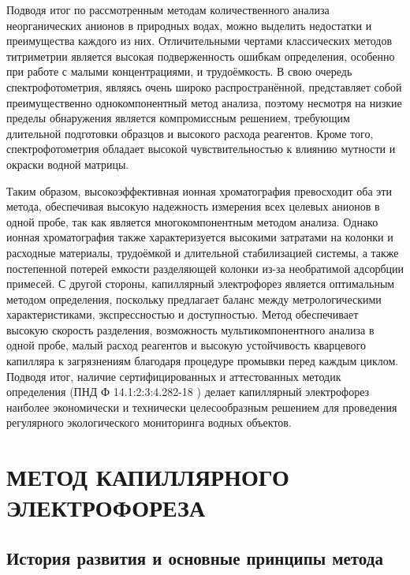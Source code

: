 Подводя итог по рассмотренным методам количественного анализа неорганических анионов в природных водах, можно выделить недостатки и преимущества каждого из них. Отличительными чертами классических методов титриметрии является высокая подверженность ошибкам определения, особенно при работе с малыми концентрациями, и трудоёмкость. В свою очередь спектрофотометрия, являясь очень широко распространённой, представляет собой преимущественно однокомпонентный метод анализа, поэтому несмотря на низкие пределы обнаружения является компромиссным решением, требующим длительной подготовки образцов и высокого расхода реагентов. Кроме того, спектрофотометрия обладает высокой чувствительностью к влиянию мутности и окраски водной матрицы.

Таким образом, высокоэффективная ионная хроматография превосходит оба эти метода, обеспечивая высокую надежность измерения всех целевых анионов в одной пробе, так как является многокомпонентным методом анализа. Однако ионная хроматография также характеризуется высокими затратами на колонки и расходные материалы, трудоёмкой и длительной стабилизацией системы, а также постепенной потерей емкости разделяющей колонки из-за необратимой адсорбции примесей. С другой стороны, капиллярный электрофорез является оптимальным методом определения, поскольку предлагает баланс между метрологическими характеристиками, экспрессностью и доступностью. Метод обеспечивает высокую скорость разделения, возможность мультикомпонентного анализа в одной пробе, малый расход реагентов и высокую устойчивость кварцевого капилляра к загрязнениям благодаря процедуре промывки перед каждым циклом. Подводя итог, наличие сертифицированных и аттестованных методик определения (ПНД Ф 14.1:2:3:4.282-18 \cite{pndf14123428218}) делает капиллярный электрофорез наиболее экономически и технически целесообразным решением для проведения регулярного экологического мониторинга водных объектов.


\section{МЕТОД КАПИЛЛЯРНОГО ЭЛЕКТРОФОРЕЗА}

\subsection{История развития и основные принципы метода}

